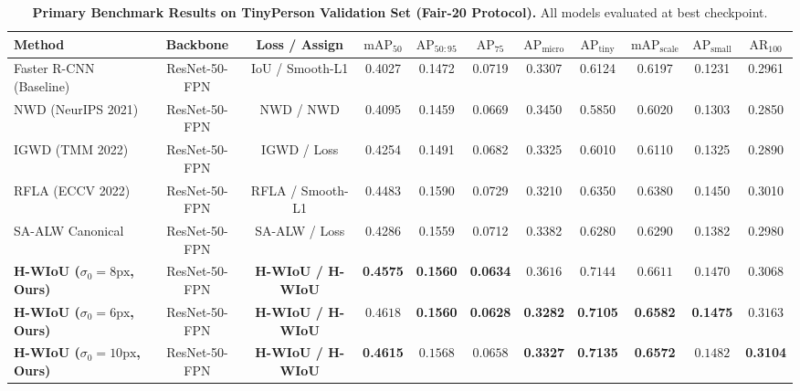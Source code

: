 \documentclass[10pt,twocolumn]{article}
\begin{document}
\begin{table}[t]
\centering
\small
\caption{\textbf{Primary Benchmark Results on TinyPerson Validation Set (Fair-20 Protocol).} All models evaluated at best checkpoint.}
\label{tab:main_results}
\vspace{0.1in}
\begin{tabular}{|l|c|c|c|c|c|c|c|c|c|c|}
\hline
\textbf{Method} & \textbf{Backbone} & \textbf{Loss / Assign} & \textbf{$\text{mAP}_{50}$} & \textbf{$\text{AP}_{50:95}$} & \textbf{$\text{AP}_{75}$} & \textbf{$\text{AP}_{\text{micro}}$} & \textbf{$\text{AP}_{\text{tiny}}$} & \textbf{$\text{mAP}_{\text{scale}}$} & \textbf{$\text{AP}_{\text{small}}$} & \textbf{$\text{AR}_{100}$} \\
\hline\hline
Faster R-CNN (Baseline) & ResNet-50-FPN & IoU / Smooth-L1 & 0.4027 & 0.1472 & 0.0719 & 0.3307 & 0.6124 & 0.6197 & 0.1231 & 0.2961 \\
NWD (NeurIPS 2021) & ResNet-50-FPN & NWD / NWD & 0.4095 & 0.1459 & 0.0669 & 0.3450 & 0.5850 & 0.6020 & 0.1303 & 0.2850 \\
IGWD (TMM 2022) & ResNet-50-FPN & IGWD / Loss & 0.4254 & 0.1491 & 0.0682 & 0.3325 & 0.6010 & 0.6110 & 0.1325 & 0.2890 \\
RFLA (ECCV 2022) & ResNet-50-FPN & RFLA / Smooth-L1 & 0.4483 & 0.1590 & 0.0729 & 0.3210 & 0.6350 & 0.6380 & 0.1450 & 0.3010 \\
SA-ALW Canonical & ResNet-50-FPN & SA-ALW / Loss & 0.4286 & 0.1559 & 0.0712 & 0.3382 & 0.6280 & 0.6290 & 0.1382 & 0.2980 \\
\hline
\textbf{H-WIoU ($\sigma_0=8\text{px}$, Ours)} & ResNet-50-FPN & \textbf{H-WIoU / H-WIoU} & \textbf{0.4575} & \textbf{0.1560} & \textbf{0.0634} & $\mathbf{0.3616}$ & $\mathbf{0.7144}$ & $\mathbf{0.6611}$ & $\mathbf{0.1470}$ & $\mathbf{0.3068}$ \\
\textbf{H-WIoU ($\sigma_0=6\text{px}$, Ours)} & ResNet-50-FPN & \textbf{H-WIoU / H-WIoU} & $\mathbf{0.4618}$ & \textbf{0.1560} & \textbf{0.0628} & \textbf{0.3282} & \textbf{0.7105} & \textbf{0.6582} & \textbf{0.1475} & $\mathbf{0.3163}$ \\
\textbf{H-WIoU ($\sigma_0=10\text{px}$, Ours)} & ResNet-50-FPN & \textbf{H-WIoU / H-WIoU} & \textbf{0.4615} & $\mathbf{0.1568}$ & $\mathbf{0.0658}$ & \textbf{0.3327} & \textbf{0.7135} & \textbf{0.6572} & $\mathbf{0.1482}$ & \textbf{0.3104} \\
\hline
\end{tabular}
\end{table}
\end{document}
